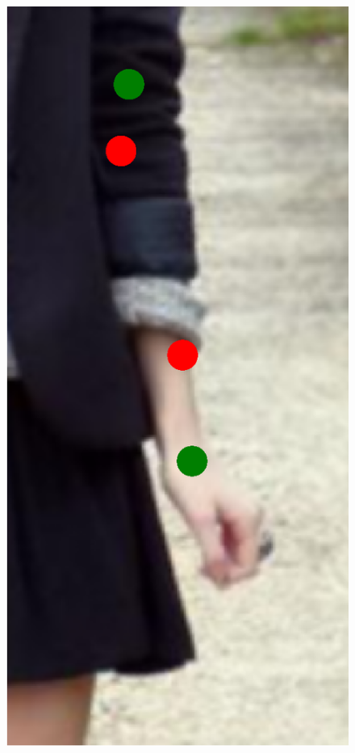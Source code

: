 \begin{figure}[!t]
    \includegraphics[height=\fh]{resources/Fixing/fix_6}
    \hfill

\end{figure}
